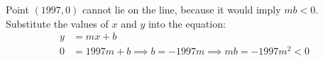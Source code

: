 Point $(1997,0)$ cannot lie on the line, because it would imply $mb<0$. Substitute the values of $x$ and $y$ into the equation:
\begin{align*}
y & = mx + b
\\
0 & = 1997m + b
\implies 
b = -1997m
\implies 
mb = -1997 m^{2} < 0
\end{align*}